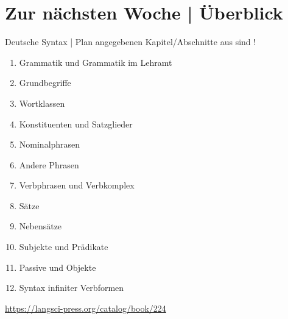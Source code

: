 \ifdefined\TITLE
  \section{Zur nächsten Woche | Überblick}

  \begin{frame}
    {Deutsche Syntax | Plan}
     angegebenen Kapitel\slash Abschnitte aus  sind !\\
    \Halbzeile
    \begin{enumerate}
      \item Grammatik und Grammatik im Lehramt 
      \item Grundbegriffe 
      \item Wortklassen 
      \item Konstituenten und Satzglieder 
      \item \alert{Nominalphrasen} 
      \item Andere Phrasen 
      \item Verbphrasen und Verbkomplex 
      \item Sätze  
      \item Nebensätze 
      \item Subjekte und Prädikate 
      \item Passive und Objekte 
      \item Syntax infiniter Verbformen 
    \end{enumerate}
    \Halbzeile
    \centering 
    \url{https://langsci-press.org/catalog/book/224}
  \end{frame}
\fi


